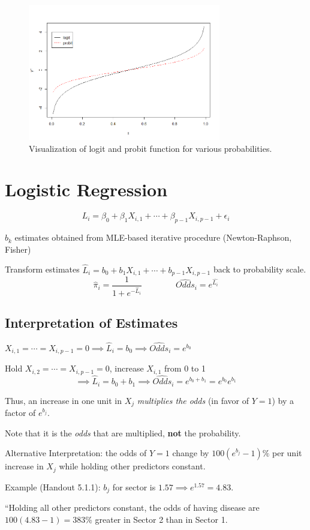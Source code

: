 \documentclass[12pt]{../notes}
\begin{document}
\begin{figure}[H]
\centering
\includegraphics[width = 0.75\textwidth]{../figures/module5/logit_probit.png}
\caption{Visualization of logit and probit function for various probabilities.}
\end{figure}

\section{Logistic Regression}

$$L_i = \beta_0 + \beta_1X_{i, 1} + \cdots + \beta_{p-1}X_{i, p-1} + \epsilon_i$$

\bi
\item $b_k$ estimates obtained from MLE-based iterative procedure (Newton-Raphson, Fisher)
\item Transform estimates $\hat{L}_i = b_0 + b_1X_{i, 1} + \cdots + b_{p-1}X_{i, p-1}$ back to probability scale. 
$$\hat{\pi}_i = \frac{1}{1+e^{-\hat{L}_i}} \qquad \qquad \hat{Odds}_i = e^{\hat{L_i}}$$
\ei

\subsection{Interpretation of Estimates}
\bi
\item $X_{i, 1} = \cdots = X_{i, p-1} = 0 \implies \hat{L}_i = b_0 \implies \hat{Odds}_i = e^{b_0}$
\item Hold $X_{i, 2} = \cdots = X_{i, p-1} = 0$, increase $X_{i, 1}$ from 0 to 1
$$\implies \hat{L}_i = b_0+b_1 \implies \hat{Odds}_i = e^{b_0 + b_1} = e^{b_0}e^{b_1}$$
\item Thus, an increase in one unit in $X_j$ \textit{multiplies the odds} (in favor of $Y=1$) by a factor of $e^{b_j}.$
\bi
\item Note that it is the \textit{odds} that are multiplied, \textbf{not} the probability. 
\ei
\item Alternative Interpretation: the odds of $Y=1$ change by $100(e^{b_j} - 1)\%$ per unit increase in $X_j$ while holding other predictors constant. 
\bi
\item Example (Handout 5.1.1): $b_j$ for sector is $1.57 \implies e^{1.57} = 4.83.$ 
\item ``Holding all other predictors constant, the odds of having disease are $100(4.83-1) = 383\%$ greater in Sector 2 than in Sector 1. 
\ei
\ei
\end{document}

